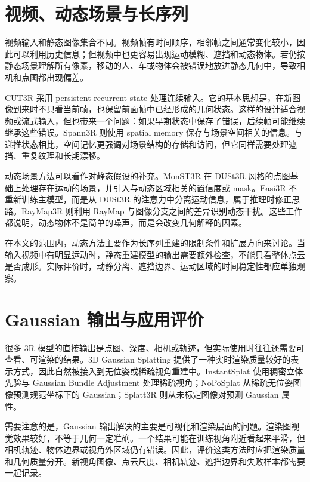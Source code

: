 \documentclass[UTF8,a4paper,zihao=-4,fontset=windows]{ctexart}
\begin{document}
\section{视频、动态场景与长序列}

视频输入和静态图像集合不同。视频帧有时间顺序，相邻帧之间通常变化较小，因此可以利用历史信息；但视频中也更容易出现运动模糊、遮挡和动态物体。若仍按静态场景理解所有像素，移动的人、车或物体会被错误地放进静态几何中，导致相机和点图都出现偏差。

CUT3R 采用 persistent recurrent state 处理连续输入\citep{cut3r}。它的基本思想是，在新图像到来时不只看当前帧，也保留前面帧中已经形成的几何状态。这样的设计适合视频或流式输入，但也带来一个问题：如果早期状态中保存了错误，后续帧可能继续继承这些错误。Spann3R 则使用 spatial memory 保存与场景空间相关的信息\citep{spann3r}。与递推状态相比，空间记忆更强调对场景结构的存储和访问，但它同样需要处理遮挡、重复纹理和长期漂移。

动态场景方法可以看作对静态假设的补充。MonST3R 在 DUSt3R 风格的点图基础上处理存在运动的场景，并引入与动态区域相关的置信度或 mask\citep{monst3r}。Easi3R 不重新训练主模型，而是从 DUSt3R 的注意力中分离运动信息，属于推理时修正思路\citep{easi3r}。RayMap3R 则利用 RayMap 与图像分支之间的差异识别动态干扰\citep{raymap3r}。这些工作都说明，动态物体不是简单的噪声，而是会改变几何解释的因素。

在本文的范围内，动态方法主要作为长序列重建的限制条件和扩展方向来讨论。当输入视频中有明显运动时，静态重建模型的输出需要额外检查，不能只看整体点云是否成形。实际评价时，动静分离、遮挡边界、运动区域的时间稳定性都应单独观察。

\section{Gaussian 输出与应用评价}

很多 3R 模型的直接输出是点图、深度、相机或轨迹，但实际使用时往往还需要可查看、可渲染的结果。3D Gaussian Splatting 提供了一种实时渲染质量较好的表示方式，因此自然被接入到无位姿或稀疏视角重建中\citep{gaussian_splatting_3d}。InstantSplat 使用稠密立体先验与 Gaussian Bundle Adjustment 处理稀疏视角；NoPoSplat 从稀疏无位姿图像预测规范坐标下的 Gaussian；Splatt3R 则从未标定图像对预测 Gaussian 属性\citep{instantsplat,noposplat,splatt3r}。

需要注意的是，Gaussian 输出解决的主要是可视化和渲染层面的问题。渲染图视觉效果较好，不等于几何一定准确。一个结果可能在训练视角附近看起来平滑，但相机轨迹、物体边界或视角外区域仍有错误。因此，评价这类方法时应把渲染质量和几何质量分开。新视角图像、点云尺度、相机轨迹、遮挡边界和失败样本都需要一起记录。
\end{document}
